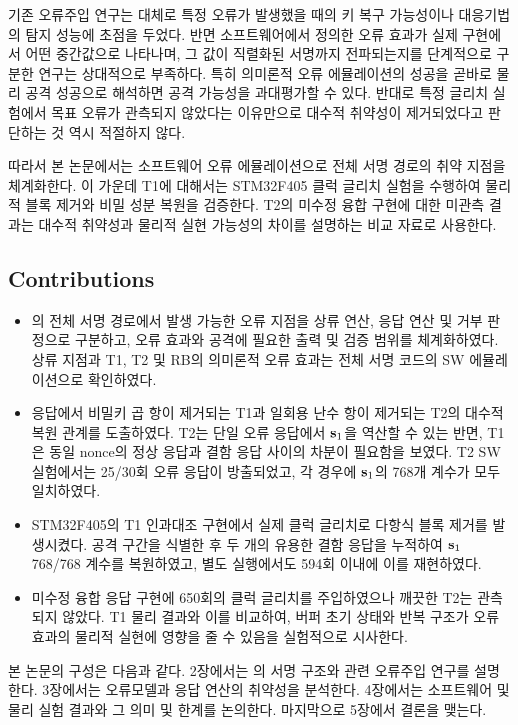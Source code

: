 기존 오류주입 연구는 대체로 특정 오류가 발생했을 때의 키 복구 가능성이나
대응기법의 탐지 성능에 초점을 두었다. 반면 소프트웨어에서 정의한 오류
효과가 실제 구현에서 어떤 중간값으로 나타나며, 그 값이 직렬화된 서명까지
전파되는지를 단계적으로 구분한 연구는 상대적으로 부족하다. 특히 의미론적
오류 에뮬레이션의 성공을 곧바로 물리 공격 성공으로 해석하면 공격 가능성을
과대평가할 수 있다. 반대로 특정 글리치 실험에서 목표 오류가 관측되지
않았다는 이유만으로 대수적 취약성이 제거되었다고 판단하는 것 역시
적절하지 않다.

따라서 본 논문에서는 소프트웨어 오류 에뮬레이션으로 
전체 서명 경로의 취약 지점을 체계화한다. 이 가운데 T1에 대해서는
STM32F405 클럭 글리치 실험을 수행하여 물리적 블록 제거와 비밀 성분
복원을 검증한다. T2의 미수정 융합 구현에 대한 미관측 결과는 대수적
취약성과 물리적 실현 가능성의 차이를 설명하는 비교 자료로 사용한다.

\subsection*{Contributions}
\begin{itemize}[leftmargin=1.2em,itemsep=0.35em,topsep=0.2em]
  \item {}의 전체 서명 경로에서 발생 가능한 오류 지점을
        상류 연산, 응답 연산 및 거부 판정으로 구분하고, 오류 효과와
        공격에 필요한 출력 및 검증 범위를 체계화하였다. 상류 지점과
        T1, T2 및 RB의 의미론적 오류 효과는 전체 서명 코드의 SW
        에뮬레이션으로 확인하였다.
  \item 응답에서 비밀키 곱 항이 제거되는 T1과 일회용 난수 항이 제거되는
        T2의 대수적 복원 관계를 도출하였다. T2는 단일 오류 응답에서
        $\mathbf{s}_1$을 역산할 수 있는 반면, T1은 동일 nonce의 정상 응답과
        결함 응답 사이의 차분이 필요함을 보였다. T2 SW 실험에서는
        25/30회 오류 응답이 방출되었고, 각 경우에 $\mathbf{s}_1$의
        768개 계수가 모두 일치하였다.
  \item STM32F405의 T1 인과대조 구현에서 실제 클럭 글리치로 다항식
        블록 제거를 발생시켰다. 공격 구간을 식별한 후 두 개의 유용한
        결함 응답을 누적하여 $\mathbf{s}_1$ 768/768 계수를 복원하였고,
        별도 실행에서도 594회 이내에 이를 재현하였다.
  \item 미수정 융합 응답 구현에 650회의 클럭 글리치를 주입하였으나
        깨끗한 T2는 관측되지 않았다. T1 물리 결과와 이를 비교하여,
        버퍼 초기 상태와 반복 구조가 오류 효과의 물리적 실현에 영향을
        줄 수 있음을 실험적으로 시사한다.
\end{itemize}

본 논문의 구성은 다음과 같다. 2장에서는 의 서명 구조와
관련 오류주입 연구를 설명한다. 3장에서는 오류모델과 응답 연산의 취약성을
분석한다. 4장에서는 소프트웨어 및 물리 실험 결과와 그 의미 및 한계를
논의한다. 마지막으로 5장에서 결론을 맺는다.
